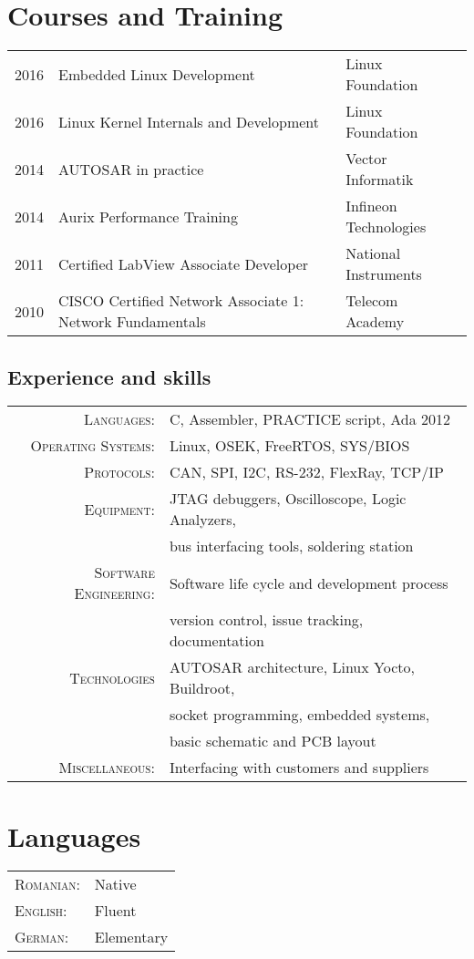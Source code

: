 \documentclass[a4paper,10pt]{article}
\begin{document}
\section{Courses and Training}
\begin{tabular}{lll}	
 \textsc{2016} & Embedded Linux Development & \footnotesize Linux Foundation\normalsize\\
 \textsc{2016} & Linux Kernel Internals and Development & \footnotesize Linux Foundation \normalsize  \\
 \textsc{2014} & AUTOSAR in practice & \footnotesize Vector Informatik \normalsize  \\
 \textsc{2014} & Aurix Performance Training & \footnotesize Infineon Technologies \normalsize\\
 \textsc{2011} & Certified LabView Associate Developer & \footnotesize National Instruments \normalsize\\
 \textsc{2010} & CISCO Certified Network Associate 1: Network Fundamentals & \footnotesize Telecom Academy \normalsize
\end{tabular}


\begin{spacing}{1.2}
\section{Experience and skills}
\begin{tabular}{rl}
\textsc{Languages:} & C, Assembler, PRACTICE script, Ada 2012 \\
\textsc{Operating Systems:} & Linux, OSEK, FreeRTOS, SYS/BIOS \\
\textsc{Protocols:} & CAN, SPI, I2C, RS-232, FlexRay, TCP/IP \\
\textsc{Equipment:} & JTAG debuggers, Oscilloscope, Logic Analyzers, \\
& bus interfacing tools, soldering station  \\
\textsc{Software Engineering:} & Software life cycle and development process\\
& version control, issue tracking, documentation\\
\textsc{Technologies} & AUTOSAR architecture, Linux Yocto, Buildroot, \\
& socket programming, embedded systems, \\
& basic schematic and PCB layout \\
\textsc{Miscellaneous:} & Interfacing with customers and suppliers\\
\end{tabular}
\end{spacing}

\section{Languages}
\begin{tabular}{ll}
 \textsc{Romanian:}& Native\\
\textsc{English:}& Fluent\\
\textsc{German:}& Elementary\\
\end{tabular}
\end{document}
